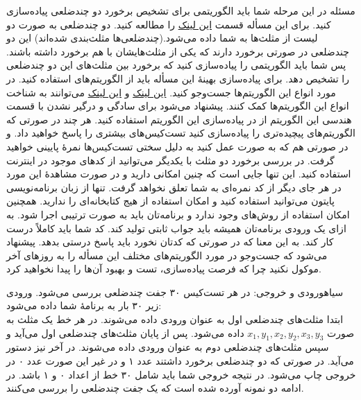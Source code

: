 ‌مسئله 
در این مرحله شما باید الگوریتمی برای تشخیص برخورد دو چندضلعی پیاده‌سازی کنید. برای این مسأله قسمت  
\href{https://en.wikipedia.org/wiki/Collision_detection}{این لینک}
را مطالعه کنید.
 دو چندضلعی به صورت دو لیست از مثلث‌ها به شما داده می‌شود.(چندضلعی‌ها مثلث‌بندی شده‌اند) این دو چندضلعی در صورتی برخورد دارند که یکی از مثلث‌هایشان با هم برخورد داشته باشند. پس شما باید الگوریتمی را پیاده‌سازی کنید که برخورد بین مثلث‌های این دو چندضلعی را تشخیص دهد. برای پیاده‌سازی بهینۀ این مسأله باید از الگوریتم‌های  استفاده کنید. در مورد انواع این الگوریتم‌ها جست‌و‌جو کنید. 
\href{http://www-ljk.imag.fr/Publications/Basilic/com.lmc.publi.PUBLI_Inproceedings@117681e94b6_1860ffd/bounding_volume_hierarchies.pdf}{این لینک}
و 
\href{https://cg.informatik.uni-freiburg.de/course_notes/sim_06_boundingVolumeHierarchies.pdf}{این لینک}
 می‌توانند به شناخت انواع این الگوریتم‌ها کمک کنند. پیشنهاد می‌شود برای سادگی و درگیر نشدن با قسمت هندسی این الگوریتم از  در پیاده‌سازی این الگوریتم استفاده کنید. هر چند در صورتی که الگوریتم‌های پیچیده‌تری را پیاده‌سازی کنید تست‌کیس‌های بیشتری را پاسخ خواهید داد. و در صورتی هم که به صورت  عمل کنید به دلیل سختی تست‌کیس‌ها نمرۀ پایینی خواهید گرفت. در بررسی برخورد دو مثلث با یکدیگر می‌توانید از کدهای موجود در اینترنت استفاده کنید. این تنها جایی است که چنین امکانی دارید و در صورت مشاهدۀ این مورد در هر جای دیگر از کد نمره‌ای به شما تعلق نخواهد گرفت. تنها از زبان برنامه‌نویسی پایتون می‌توانید استفاده کنید و امکان استفاده از هیج کتابخانه‌ای را ندارید. همچنین امکان استفاده از روش‌های  وجود ندارد و برنامه‌تان باید به صورت ترتیبی اجرا شود. به ازای یک ورودی برنامه‌تان همیشه باید جواب ثابتی تولید کند. کد شما باید کاملاً درست کار کند. به این معنا که در صورتی که کدتان  نخورد باید پاسخ درستی بدهد. پیشنهاد می‌شود که جست‌و‌جو در مورد الگوریتم‌های مختلف این مسأله را به روزهای آخر موکول نکنید چرا که فرصت پیاده‌سازی، تست و بهبود آن‌ها را پیدا نخواهید کرد.
 
 ‌سیاه{ورودی و خروجی:}
 در هر تست‌کیس ۳۰ جفت چندضلعی بررسی می‌شود. ورودی زیر ۳۰ بار به برنامۀ شما داده می‌شود:
 \\
 ابتدا مثلث‌های چندضلعی اول به عنوان ورودی داده می‌شوند. در هر خط یک مثلث به صورت 
 $x_1, y_1, x_2, y_2, x_3, y_3$
  داده می‌شود. پس از پایان مثلث‌های چندضلعی اول  می‌آید و سپس مثلث‌های چندضلعی دوم به عنوان ورودی داده می‌شوند. در آخر نیز دستور  می‌آید. در صورتی که دو چندضلعی برخورد داشتند عدد ۱ و در غیر این صورت عدد ۰ در خروجی چاپ می‌شود. در نتیجه خروجی شما باید شامل ۳۰ خط از اعداد ۰ و ۱ باشد. در ادامه دو نمونه آورده شده است که یک جفت چندضلعی را بررسی می‌کنند.
 
